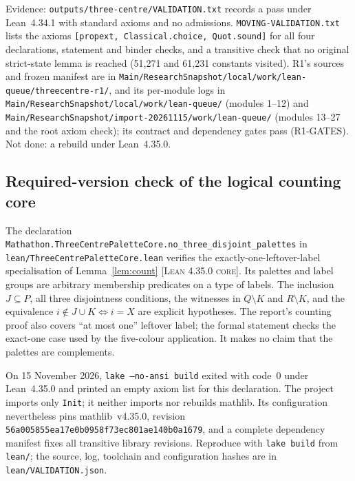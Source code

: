 \documentclass[11pt]{article}
\theoremstyle{definition}
\theoremstyle{remark}
\newcommand{\st}[1]{\textsc{[#1]}}
\begin{document}
\noindent Evidence: \texttt{outputs/\allowbreak{}three-\allowbreak{}centre/\allowbreak{}VALIDATION.\allowbreak{}txt} records a pass under Lean~4.34.1 with standard axioms and no admissions. \texttt{MOVING-\allowbreak{}VALIDATION.\allowbreak{}txt} lists the axioms \texttt{[propext, Classical.\allowbreak{}choice, Quot.\allowbreak{}sound]} for all four declarations, statement and binder checks, and a transitive check that no original strict-state lemma is reached (51,271 and 61,231 constants visited). R1's sources and frozen manifest are in \texttt{Main/\allowbreak{}ResearchSnapshot/\allowbreak{}local/\allowbreak{}work/\allowbreak{}lean-\allowbreak{}queue/\allowbreak{}threecentre-\allowbreak{}r1/}, and its per-module logs in \texttt{Main/\allowbreak{}ResearchSnapshot/\allowbreak{}local/\allowbreak{}work/\allowbreak{}lean-\allowbreak{}queue/\allowbreak{}} (modules 1--12) and \texttt{Main/\allowbreak{}ResearchSnapshot/\allowbreak{}import-\allowbreak{}20261115/\allowbreak{}work/\allowbreak{}lean-\allowbreak{}queue/\allowbreak{}} (modules 13--27 and the root axiom check); its contract and dependency gates pass (R1-GATES). Not done: a rebuild under Lean~4.35.0.

\subsection{Required-version check of the logical counting core}
\label{sec:core435}
The declaration
\texttt{Mathathon.\allowbreak{}ThreeCentrePaletteCore.\allowbreak{}no\_\allowbreak{}three\_\allowbreak{}disjoint\_\allowbreak{}palettes}
in \texttt{lean/\allowbreak{}ThreeCentrePaletteCore.lean} verifies the
exactly-one-leftover-label specialisation of Lemma~\ref{lem:count}
\st{Lean 4.35.0 core}. Its palettes and label groups are arbitrary membership
predicates on a type of labels. The inclusion $J\subseteq P$, all three
disjointness conditions, the witnesses in $Q\setminus K$ and $R\setminus K$,
and the equivalence $i\notin J\cup K\Longleftrightarrow i=X$ are explicit
hypotheses. The report's counting proof also covers ``at most one'' leftover
label; the formal statement checks the exact-one case used by the five-colour
application. It makes no claim that the palettes are complements.

On 15 November 2026, \texttt{lake --no-ansi build} exited with code~0 under
Lean~4.35.0 and printed an empty axiom list for this declaration. The project
imports only \texttt{Init}; it neither imports nor rebuilds mathlib.
Its configuration nevertheless pins mathlib~v4.35.0, revision
\texttt{56a005855ea17e0b0958f73ec801ae140b0a1679}, and a complete dependency
manifest fixes all transitive library revisions. Reproduce with
\texttt{lake build} from \texttt{lean/}; the source, log, toolchain and
configuration hashes are in \texttt{lean/VALIDATION.json}.
\end{document}
